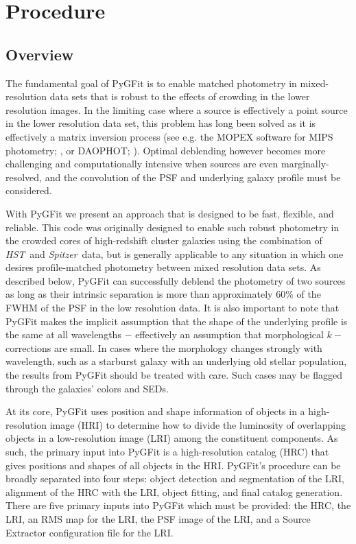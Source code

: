 \documentclass[preprint]{aastex}
\newcommand{\pygfit}{PyGFit}
\newcommand{\extractor}{Source Extractor}
\newcommand{\spitzer}{{\it Spitzer}}
\newcommand{\hst}{{\it HST}}
\begin{document}
\section{Procedure}\label{sec:procedure}

\subsection{Overview}

The fundamental goal of \pygfit{} is to enable matched photometry in mixed-resolution data sets that is robust to the effects of crowding in the lower resolution images. In the limiting case where a source is effectively a point source in the lower resolution data set, this problem has long been solved as it is effectively a matrix inversion process (see e.g. the MOPEX software for MIPS photometry; \citealt{mopex}, or DAOPHOT; \citealt{stetson87}). Optimal deblending however becomes more challenging and computationally intensive when sources are even marginally-resolved, and the convolution of the PSF and underlying galaxy profile must be considered. 

With \pygfit{} we present an approach that is designed to be fast, flexible, and reliable. This code was originally designed to enable such robust photometry in the crowded cores of high-redshift cluster galaxies using the combination of \hst\ and \spitzer\ data, but is generally applicable to any situation in which one desires profile-matched photometry between mixed resolution data sets. As described below, \pygfit{} can successfully deblend the photometry of two sources as long as their intrinsic separation is more than approximately $60\%$ of the FWHM of the PSF in the low resolution data.  It is also important to note that \pygfit{} makes the implicit assumption that the shape of the underlying profile is the same at all wavelengths $-$ effectively an assumption that morphological $k-$corrections are small. In cases where the morphology changes strongly with wavelength, such as a starburst galaxy with an underlying old stellar population, the results from \pygfit{} should be treated with care.  Such cases may be flagged through the galaxies' colors and SEDs.

At its core, \pygfit{} uses position and shape information of objects in a high-resolution image (HRI) to determine how to divide the luminosity of overlapping objects in a low-resolution image (LRI) among the constituent components.  As such, the primary input into \pygfit{} is a high-resolution catalog (HRC) that gives positions and shapes of all objects in the HRI.  \pygfit{}'s procedure can be broadly separated into four steps: object detection and segmentation of the LRI, alignment of the HRC with the LRI, object fitting, and final catalog generation.  There are five primary inputs into \pygfit{} which must be provided: the HRC, the LRI, an RMS map for the LRI, the PSF image of the LRI, and a \extractor{} configuration file for the LRI.
\end{document}
